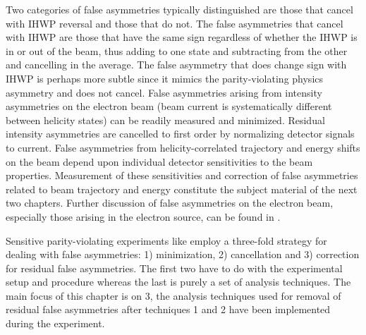 Two categories of false asymmetries typically distinguished are those that cancel with IHWP reversal and those that do not. The false asymmetries that cancel with IHWP are those that have the same sign regardless of whether the IHWP is in or out of the beam, thus adding to one state and subtracting from the other and cancelling in the average. The false asymmetry that does change sign with IHWP is perhaps more subtle since it mimics the parity-violating physics asymmetry and does not cancel. False asymmetries arising from intensity asymmetries on the electron beam (beam current is systematically different between helicity states) can be readily measured and minimized. Residual intensity asymmetries are cancelled to first order by normalizing detector signals to current. False asymmetries from helicity-correlated trajectory and energy shifts on the beam depend upon individual detector sensitivities to the beam properties. Measurement of these sensitivities and correction of false asymmetries related to beam trajectory and energy constitute the subject material of the next two chapters. Further discussion of false asymmetries on the electron beam, especially those arising in the electron source, can be found in \cite{Paschke2007}.

Sensitive parity-violating experiments like \Qs employ a three-fold strategy for dealing with false asymmetries: 1) minimization, 2) cancellation and 3) correction for residual false asymmetries. The first two have to do with the experimental setup and procedure whereas the last is purely a set of analysis techniques. The main focus of this chapter is on 3, the analysis techniques used for removal of residual false asymmetries after techniques 1 and 2 have been implemented during the experiment.  
